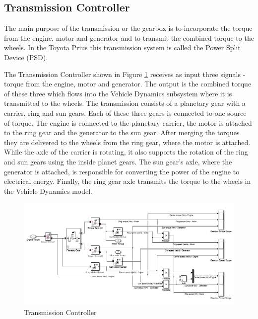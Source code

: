 \subsection{Transmission Controller}
The main purpose of the transmission or the gearbox is to incorporate the torque from the engine, motor and generator and to transmit the combined torque to the wheels. In the Toyota Prius this transmission system is called the Power Split Device (PSD). 

The Transmission Controller shown in Figure \ref{fig:transmissioncontroller} receives as input three signals - torque from the engine, motor and generator. The output is the combined torque of these three which flows into the Vehicle Dynamics subsystem where it is transmitted to the wheels. The transmission consists of a planetary gear with a carrier, ring and sun gears. Each of these three gears is connected to one source of torque. The engine is connected to the planetary carrier, the motor is attached to the ring gear and the generator to the sun gear. After merging the torques they are delivered to the wheels from the ring gear, where the motor is attached. While the axle of the carrier is rotating, it also supports the rotation of the ring and sun gears using the inside planet gears. The sun gear's axle, where the generator is attached, is responsible for converting the power of the engine to electrical energy. Finally, the ring gear axle transmits the torque to the wheels in the Vehicle Dynamics model. 

\begin{figure}[h]
\centering
\includegraphics[scale=0.5]{figures/hev/transmissioncontroller}
\caption{Transmission Controller}
\label{fig:transmissioncontroller}
\end{figure}

